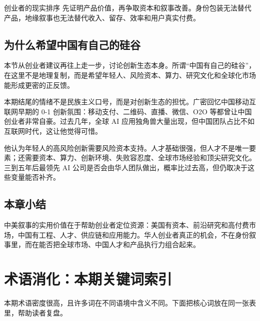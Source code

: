 \documentclass[a4paper]{article}
\begin{document}
\begin{importantbox}{创业者的现实排序}
先证明产品价值，再争取资本和叙事改善。身份包装无法替代产品，地缘叙事也无法替代收入、留存、效率和用户真实付费。
\end{importantbox}

\subsection{为什么希望中国有自己的硅谷}

本节从创业者建议再往上走一步，讨论创新生态本身。所谓“中国有自己的硅谷”，在这里不是地理复制，而是希望年轻人、风险资本、算力、研究文化和全球化市场能形成更密的正反馈。

本期结尾的情绪不是民族主义口号，而是对创新生态的担忧。广密回忆中国移动互联网早期的 0-1 创新氛围：移动支付、二维码、直播、微信、O2O 等都曾让中国创业者非常自豪。过去几年，全球 AI 应用独角兽大量出现，但中国团队占比不如互联网时代，这让他觉得可惜。

他认为年轻人的高风险创新需要风险资本支持。人才基础很强，但人才不是唯一要素；还需要资本、算力、创新环境、失败容忍度、全球市场经验和顶尖研究文化。三到五年后最领先 AI 公司是否会由华人团队做出，概率比过去高，但仍取决于这些变量能否补齐。

\subsection{本章小结}

中美叙事的实用价值在于帮助创业者定位资源：美国有资本、前沿研究和高付费市场，中国有工程、人才、供应链和应用能力。华人创业者真正的机会，不在身份叙事里，而在能否把全球市场、中国人才和产品执行力组合起来。

\section{术语消化：本期关键词索引}

本期术语密度很高，且许多词在不同语境中含义不同。下面把核心词放在同一张表里，帮助读者复盘。
\end{document}
